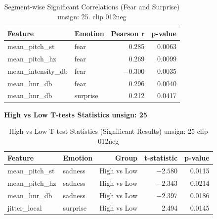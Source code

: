   \begin{table}[H]
    \centering 
    \begin{tabular}{llrr}
      \toprule
      \textbf{Feature}         & \textbf{Emotion} & \textbf{Pearson r} & \textbf{p-value} \\
      \midrule
      mean\_pitch\_st          & fear             & 0.285              & 0.0063           \\
      mean\_pitch\_hz          & fear             & 0.269              & 0.0099           \\
      mean\_intensity\_db      & fear             & $-0.300$           & 0.0035           \\
      mean\_hnr\_db            & fear             & 0.296              & 0.0040           \\
      mean\_hnr\_db            & surprise         & 0.212              & 0.0417           \\
      \bottomrule
    \end{tabular}
    \caption{Segment-wise Significant Correlations (Fear and Surprise) unsign: 25. clip 012neg}
    \label{tab:segcorr_fear_012}
  \end{table}
  
 
  \begin{table}[H]
    \centering
    \caption*{\textbf{High vs Low T-tests Statistics unsign: 25}}
    \begin{tabular}{llrrr}
      \toprule
      \textbf{Feature}         & \textbf{Emotion} & \textbf{Group}     & \textbf{t-statistic} & \textbf{p-value} \\
      \midrule
      mean\_pitch\_st          & sadness          & High vs Low        & $-2.580$             & 0.0115           \\
      mean\_pitch\_hz          & sadness          & High vs Low        & $-2.343$             & 0.0214           \\
      mean\_hnr\_db            & sadness          & High vs Low        & $-2.397$             & 0.0186           \\
      jitter\_local            & surprise         & High vs Low        & 2.494                & 0.0145           \\
      \bottomrule
    \end{tabular}
    \caption{High vs Low T-test Statistics (Significant Results) unsign: 25 clip 012neg}
    \label{tab:seghighlow_sad_surp_012}
  \end{table}
  



